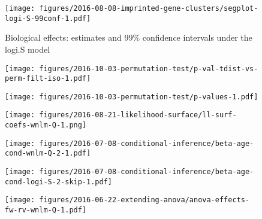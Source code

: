 \documentclass[letterpaper]{article}
\begin{document}
\begin{figure}
\begin{center}
\texttt{[image: figures/2016-08-08-imprinted-gene-clusters/segplot-logi-S-99conf-1.pdf]}
\end{center}
\caption{Biological effects: estimates and $99\%$ confidence intervals under
the logi.S model}
\label{fig:biol-effects-logi.S}
\end{figure}

\begin{figure}
\begin{center}
\texttt{[image: figures/2016-10-03-permutation-test/p-val-tdist-vs-perm-filt-iso-1.pdf]}
\end{center}
\caption{}
\label{fig:p-val-tdist-vs-perm}
\end{figure}

\begin{figure}
\begin{center}
\texttt{[image: figures/2016-10-03-permutation-test/p-values-1.pdf]}
\end{center}
\caption{}
\label{fig:pval}
\end{figure}

\begin{figure}
\begin{center}
\texttt{[image: figures/2016-08-21-likelihood-surface/ll-surf-coefs-wnlm-Q-1.png]}
\end{center}
\caption{}
\label{fig:likelihood-surface}
\end{figure}

\begin{figure}
\begin{center}
\texttt{[image: figures/2016-07-08-conditional-inference/beta-age-cond-wnlm-Q-2-1.pdf]}
\end{center}
\caption{}
\label{fig:interaction-wnlm.Q}
\end{figure}

\begin{figure}
\begin{center}
\texttt{[image: figures/2016-07-08-conditional-inference/beta-age-cond-logi-S-2-skip-1.pdf]}
\end{center}
\caption{}
\label{fig:interaction-logi.S}
\end{figure}

\begin{figure}
\begin{center}
\texttt{[image: figures/2016-06-22-extending-anova/anova-effects-fw-rv-wnlm-Q-1.pdf]}
\end{center}
\caption{}
\label{fig:anova}
\end{figure}
\end{document}

